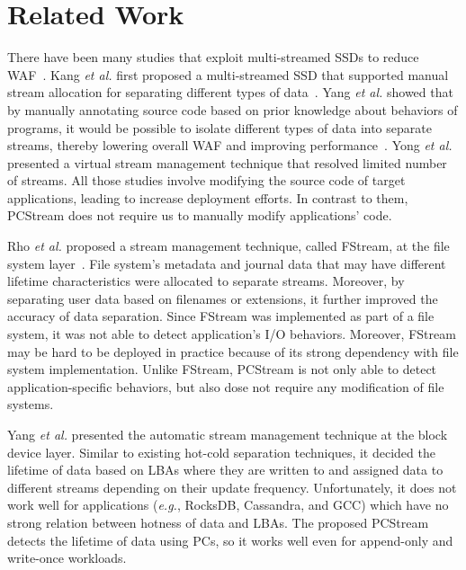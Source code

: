 \vspace{-10pt}
\section{Related Work}
\vspace{-5pt}
There have been many studies that exploit multi-streamed SSDs to reduce
WAF~\cite{MultiStream, Level, vStream, FStream, AutoStream, PCStream}.  Kang
{\it et al.} first proposed a multi-streamed SSD that supported manual stream
allocation for separating different types of data~\cite{MultiStream}.  Yang
{\it et al.} showed that by manually annotating source code based on prior
knowledge about behaviors of programs, it would be possible to isolate
different types of data into separate streams, thereby lowering overall WAF and
improving performance~\cite{Level}.  Yong {\it et al.} presented a virtual
stream management technique that resolved limited number of streams.  All those
studies involve modifying the source code of target applications, leading to
increase deployment efforts.  In contrast to them, PCStream does not require us
to manually modify applications' code.

Rho {\it et al.} proposed a stream management technique, called FStream, at the
file system layer~\cite{FStream}. File system's metadata and journal data that
may have different lifetime characteristics were allocated to separate streams.
Moreover, by separating user data based on filenames or extensions, it further
improved the accuracy of data separation. Since FStream was implemented as part
of a file system, it was not able to detect application's I/O behaviors.
Moreover, FStream may be hard to be deployed in practice because of its strong
dependency with file system implementation. Unlike FStream, PCStream is not
only able to detect application-specific behaviors, but also dose not require
any modification of file systems.

Yang {\it et al.} presented the automatic stream management technique at the
block device layer. Similar to existing hot-cold separation techniques, it
decided the lifetime of data based on LBAs where they are written to and
assigned data to different streams depending on their update frequency.
Unfortunately, it does not work well for applications ({\it e.g.}, RocksDB,
Cassandra, and GCC) which have no strong relation between hotness of data and
LBAs.  The proposed PCStream detects the lifetime of data using PCs, so it
works well even for append-only and write-once workloads.

